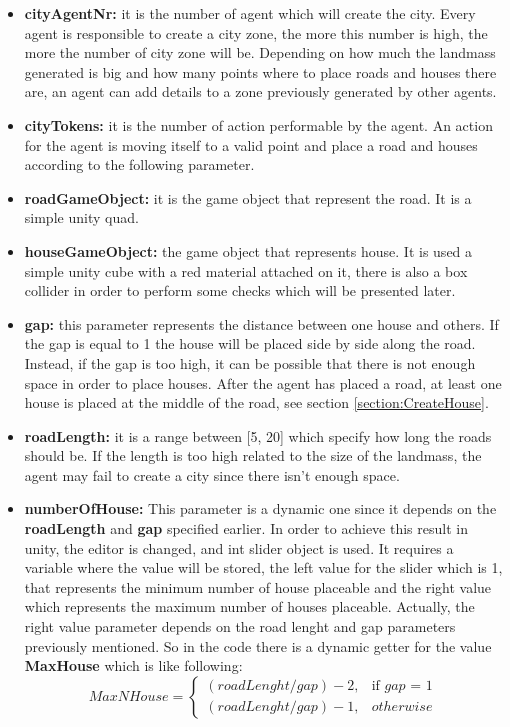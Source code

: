 \documentclass[12pt]{article}
\begin{document}
    \begin{itemize}
        \item \textbf{cityAgentNr:} it is the number of agent which will create the city. Every agent is responsible to create a city zone, the more this 
        number is high, the more the number of city zone will be. Depending on how much the landmass generated is big and how many points where to place roads
        and houses there are, an agent can add details to a zone previously generated by other agents.
        \item \textbf{cityTokens:} it is the number of action performable by the agent. An action for the agent is moving itself to a valid point and place a road 
        and houses according to the following parameter.
        \item \textbf{roadGameObject:} it is the game object that represent the road. It is a simple unity quad.
        \item \textbf{houseGameObject:} the game object that represents house. It is used a simple unity cube with a red material attached on it, there is also a box collider
        in order to perform some checks which will be presented later.
        \item \textbf{gap:} this parameter represents the distance between one house and others. If the gap is equal to 1 the house will be placed side by side
        along the road. Instead, if the gap is too high, it can be possible that there is not enough space in order to place houses. After the agent has placed a road,
        at least one house is placed at the middle of the road, see section \ref{section:CreateHouse}. 
        \item \textbf{roadLength:} it is a range between [5, 20] which specify how long the roads should be. If the length is too high related to the size of the landmass,
        the agent may fail to create a city since there isn't enough space. 
        \item \textbf{numberOfHouse:} This parameter is a dynamic one since it depends on the \textbf{roadLength} and \textbf{gap} specified earlier. In order to achieve this result in unity,
        the editor is changed, and int slider object is used. It requires a variable where the value will be stored, the left value for the slider which is 1, that
        represents the minimum number of house placeable and the right value which represents the maximum number of houses placeable. Actually, the right value parameter depends on
        the road lenght and gap parameters previously mentioned. So in the code there is a dynamic getter for the value \textbf{MaxHouse} which is like following:
        \begin{equation}
            MaxNHouse = \begin{cases} (roadLenght/gap) - 2, & \mbox{if } gap\mbox{ = 1} \\ (roadLenght/gap) - 1, & \mbox{} otherwise\  \end{cases}
        \end{equation}


\end{itemize}
\end{document}
